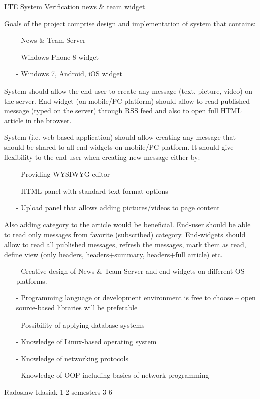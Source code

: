 \begin{project}
{LTE System Verification news \& team widget}
{
Goals of the project comprise design and implementation of system that contains:
\begin{itemize}
\item[-] News \& Team Server
\item[-] Windows Phone 8 widget
\item[-] Windows 7, Android, iOS widget
\end{itemize}
System should allow the end user to create any message (text, picture, video) on the server. 
End-widget (on mobile/PC platform) should allow to read published message (typed on the server) 
through RSS feed and also to open full HTML article in the browser. } 
{
System (i.e. web-based application) should allow creating any message that
should be shared to all end-widgets on mobile/PC platform. It should give 
flexibility to the end-user when creating new message either by: 
\begin{itemize}
\item[-] Providing WYSIWYG editor
\item[-] HTML panel with standard text format options
\item[-] Upload panel that allows adding pictures/videos to page content
\end{itemize}
Also adding category to the article would be beneficial. End-user should be able to read only messages
 from favorite (subscribed) category. End-widgets should allow to read all published messages, refresh the messages,
  mark them as read, define view (only headers, headers+summary, headers+full article) etc. }
{
\begin{itemize}
\item[-] Creative design of News \& Team Server and end-widgets on different OS
platforms.
\item[-] Programming language or development environment is free to choose – open source-based libraries will be preferable
\item[-] Possibility of applying database systems
\item[-] Knowledge of Linux-based operating system
\item[-] Knowledge of networking protocols
\item[-] Knowledge of OOP including basics of network programming
\end{itemize}
}
{Radoslaw Idasiak}
{1-2 semesters}
{3-6}
\end{project}
